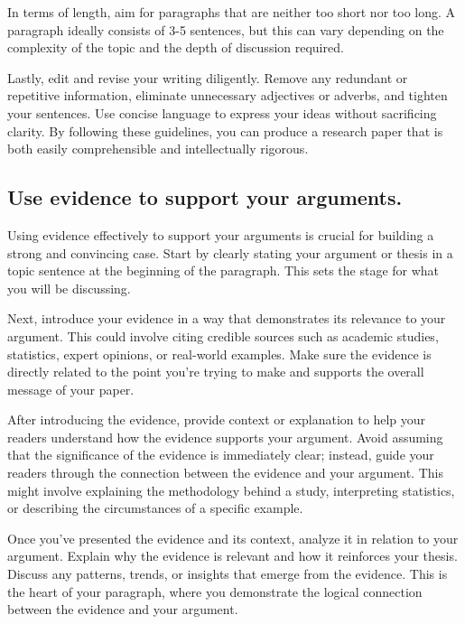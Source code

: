 \documentclass[
]{book}
\begin{document}
In terms of length, aim for paragraphs that are neither too short nor too long. A paragraph ideally consists of 3-5 sentences, but this can vary depending on the complexity of the topic and the depth of discussion required.

Lastly, edit and revise your writing diligently. Remove any redundant or repetitive information, eliminate unnecessary adjectives or adverbs, and tighten your sentences. Use concise language to express your ideas without sacrificing clarity. By following these guidelines, you can produce a research paper that is both easily comprehensible and intellectually rigorous.

\hypertarget{use-evidence-to-support-your-arguments.}{%
\subsection*{Use evidence to support your arguments.}\label{use-evidence-to-support-your-arguments.}}

Using evidence effectively to support your arguments is crucial for building a strong and convincing case. Start by clearly stating your argument or thesis in a topic sentence at the beginning of the paragraph. This sets the stage for what you will be discussing.

Next, introduce your evidence in a way that demonstrates its relevance to your argument. This could involve citing credible sources such as academic studies, statistics, expert opinions, or real-world examples. Make sure the evidence is directly related to the point you're trying to make and supports the overall message of your paper.

After introducing the evidence, provide context or explanation to help your readers understand how the evidence supports your argument. Avoid assuming that the significance of the evidence is immediately clear; instead, guide your readers through the connection between the evidence and your argument. This might involve explaining the methodology behind a study, interpreting statistics, or describing the circumstances of a specific example.

Once you've presented the evidence and its context, analyze it in relation to your argument. Explain why the evidence is relevant and how it reinforces your thesis. Discuss any patterns, trends, or insights that emerge from the evidence. This is the heart of your paragraph, where you demonstrate the logical connection between the evidence and your argument.
\end{document}
